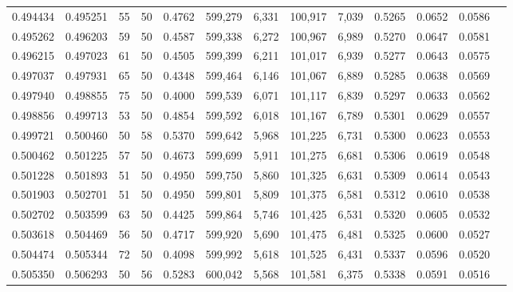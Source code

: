 \begin{tabular}{rrrrrrrrrrrrr}
0.494434 & 0.495251 &    55 &  50 &                                     0.4762 & 599,279 &   6,331 & 100,917 &   7,039 & 0.5265 & 0.0652 & 0.0586 \\
0.495262 & 0.496203 &    59 &  50 &                                     0.4587 & 599,338 &   6,272 & 100,967 &   6,989 & 0.5270 & 0.0647 & 0.0581 \\
0.496215 & 0.497023 &    61 &  50 &                                     0.4505 & 599,399 &   6,211 & 101,017 &   6,939 & 0.5277 & 0.0643 & 0.0575 \\
0.497037 & 0.497931 &    65 &  50 &                                     0.4348 & 599,464 &   6,146 & 101,067 &   6,889 & 0.5285 & 0.0638 & 0.0569 \\
0.497940 & 0.498855 &    75 &  50 &                                     0.4000 & 599,539 &   6,071 & 101,117 &   6,839 & 0.5297 & 0.0633 & 0.0562 \\
0.498856 & 0.499713 &    53 &  50 &                                     0.4854 & 599,592 &   6,018 & 101,167 &   6,789 & 0.5301 & 0.0629 & 0.0557 \\
0.499721 & 0.500460 &    50 &  58 &                                     0.5370 & 599,642 &   5,968 & 101,225 &   6,731 & 0.5300 & 0.0623 & 0.0553 \\
0.500462 & 0.501225 &    57 &  50 &                                     0.4673 & 599,699 &   5,911 & 101,275 &   6,681 & 0.5306 & 0.0619 & 0.0548 \\
0.501228 & 0.501893 &    51 &  50 &                                     0.4950 & 599,750 &   5,860 & 101,325 &   6,631 & 0.5309 & 0.0614 & 0.0543 \\
0.501903 & 0.502701 &    51 &  50 &                                     0.4950 & 599,801 &   5,809 & 101,375 &   6,581 & 0.5312 & 0.0610 & 0.0538 \\
0.502702 & 0.503599 &    63 &  50 &                                     0.4425 & 599,864 &   5,746 & 101,425 &   6,531 & 0.5320 & 0.0605 & 0.0532 \\
0.503618 & 0.504469 &    56 &  50 &                                     0.4717 & 599,920 &   5,690 & 101,475 &   6,481 & 0.5325 & 0.0600 & 0.0527 \\
0.504474 & 0.505344 &    72 &  50 &                                     0.4098 & 599,992 &   5,618 & 101,525 &   6,431 & 0.5337 & 0.0596 & 0.0520 \\
0.505350 & 0.506293 &    50 &  56 &                                     0.5283 & 600,042 &   5,568 & 101,581 &   6,375 & 0.5338 & 0.0591 & 0.0516 \\

\end{tabular}
